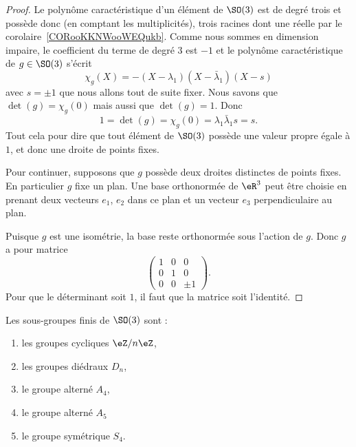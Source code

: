 \begin{proof}
	Le polynôme caractéristique d'un élément de \( \SO(3)\) est de degré trois et possède donc (en comptant les multiplicités), trois racines dont une réelle par le corolaire~\ref{CORooKKNWooWEQukb}. Comme nous sommes en dimension impaire, le coefficient du terme de degré \( 3\) est \( -1\) et le polynôme caractéristique de \( g\in\SO(3)\) s'écrit
	\begin{equation}
		\chi_g(X)=-(X-\lambda_1)(X-\bar\lambda_1)(X-s)
	\end{equation}
	avec \( s=\pm1 \) que nous allons tout de suite fixer. Nous savons que \( \det(g)=\chi_g(0)\) mais aussi que \( \det(g)=1\). Donc
	\begin{equation}
		1=\det(g)=\chi_g(0)=\lambda_1\bar\lambda_1 s=s.
	\end{equation}
	Tout cela pour dire que tout élément de \( \SO(3)\) possède une valeur propre égale à \( 1\), et donc une droite de points fixes.

	Pour continuer, supposons que \( g\) possède deux droites distinctes de points fixes. En particulier \( g\) fixe un plan. Une base orthonormée de \( \eR^3\) peut être choisie en prenant deux vecteurs \( e_1\), \( e_2\) dans ce plan et un vecteur \( e_3\) perpendiculaire au plan.

	Puisque \( g\) est une isométrie, la base reste orthonormée sous l'action de \( g\). Donc \( g\) a pour matrice
	\begin{equation}
		\begin{pmatrix}
			1 & 0 & 0     \\
			0 & 1 & 0     \\
			0 & 0 & \pm 1
		\end{pmatrix}.
	\end{equation}
	Pour que le déterminant soit \( 1\), il faut que la matrice soit l'identité.
\end{proof}

\begin{proposition}      \label{PROPooBHPNooHPlgwH}
	Les sous-groupes finis de \( \SO(3)\) sont :
	\begin{multicols}{2}
		\begin{enumerate}
			\item
			      les groupes cycliques \( \eZ/n\eZ\),
			\item
			      les groupes diédraux \( D_n\),
			\item
			      le groupe alterné \( A_4\),
			\item
			      le groupe alterné \( A_5\)
			\item
			      le groupe symétrique \( S_4\).
		\end{enumerate}
	\end{multicols}
\end{proposition}


